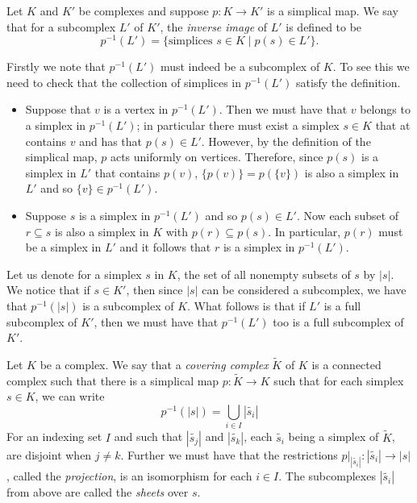 \begin{definition}
  Let $K$ and $K'$ be complexes and suppose $p: K \rightarrow K'$ is a simplical map. We say that for a subcomplex $L'$ of $K'$, the \emph{inverse image} of $L'$ is defined to be
  \begin{equation*}
    p^{-1}(L') = \{ \text{simplices } s \in K \mid p(s) \in L' \}.
  \end{equation*}
\end{definition}

Firstly we note that $p^{-1}(L')$ must indeed be a subcomplex of $K$. To see this we need to check that the collection of simplices in $p^{-1}(L')$ satisfy the definition.

\begin{itemize}
\item Suppose that $v$ is a vertex in $p^{-1}(L')$. Then we must have that $v$ belongs to a simplex in $p^{-1}(L')$; in particular there must exist a simplex $s \in K$ that at contains $v$ and has that $p(s) \in L'$. However, by the definition of the simplical map, $p$ acts uniformly on vertices. Therefore, since $p(s)$ is a simplex in $L'$ that contains $p(v)$, $\{ p(v) \} = p(\{ v \})$ is also a simplex in $L'$ and so $\{ v \} \in p^{-1}(L')$.
\item Suppose $s$ is a simplex in $p^{-1}(L')$ and so $p(s) \in L'$. Now each subset of $r \subseteq s$ is also a simplex in $K$ with $p(r) \subseteq p(s)$. In particular, $p(r)$ must be a simplex in $L'$ and it follows that $r$ is a simplex in $p^{-1}(L')$.
\end{itemize}

Let us denote for a simplex $s$ in $K$, the set of all nonempty subsets of $s$ by $|s|$. We notice that if $s \in K'$, then since $|s|$ can be considered a subcomplex, we have that $p^{-1}(|s|)$ is a subcomplex of $K$. What follows is that if $L'$ is a full subcomplex of $K'$, then we must have that $p^{-1}(L')$ too is a full subcomplex of $K'$.
\begin{definition}
  Let $K$ be a complex. We say that a \emph{covering complex} $\tilde{K}$  of $K$ is a connected complex such that there is a simplical map $p:\tilde{K} \rightarrow K$ such that for each simplex $s \in K$, we can write
  \begin{equation*}
    p^{-1}(|s|) = \bigcup_{i \in I} |\tilde{s_i}|
  \end{equation*}
  For an indexing set $I$ and such that $|\tilde{s_j}|$ and $|\tilde{s_k}|$, each $\tilde{s_i}$ being a simplex of $\tilde{K}$, are disjoint when $j \neq k$. Further we must have that the restrictions $p \vert_{|\tilde{s_i}|} : |\tilde{s_i}| \rightarrow |s|$, called the \emph{projection}, is an isomorphism for each $i \in I$. The subcomplexes $|\tilde{s_i}|$ from above are called the \emph{sheets} over $s$.
\end{definition}

